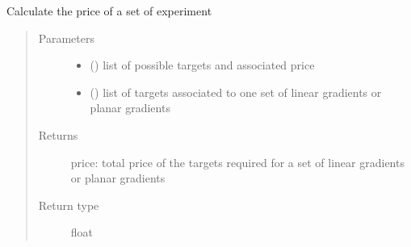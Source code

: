 \documentclass[letterpaper,10pt,english]{sphinxmanual}
\begin{document}
\label{\detokenize{ExperimentsPlannification:module-modules}}

\begin{fulllineitems}
\label{\detokenize{ExperimentsPlannification:modules.price_calculation}}
\sphinxAtStartPar
Calculate the price of a set of experiment
\begin{quote}\begin{description}
\item[{Parameters}] \leavevmode\begin{itemize}
\item {} 
\sphinxAtStartPar
{} () \textendash{} list of possible targets and associated price

\item {} 
\sphinxAtStartPar
{} () \textendash{} list of targets associated to one set of linear gradients or planar gradients

\end{itemize}

\item[{Returns}] \leavevmode
\sphinxAtStartPar
price: total price of the targets required for a set of linear gradients or planar gradients

\item[{Return type}] \leavevmode
\sphinxAtStartPar
float

\end{description}\end{quote}

\end{fulllineitems}

\label{\detokenize{ExperimentsPlannification:module-modules}}
\end{document}
